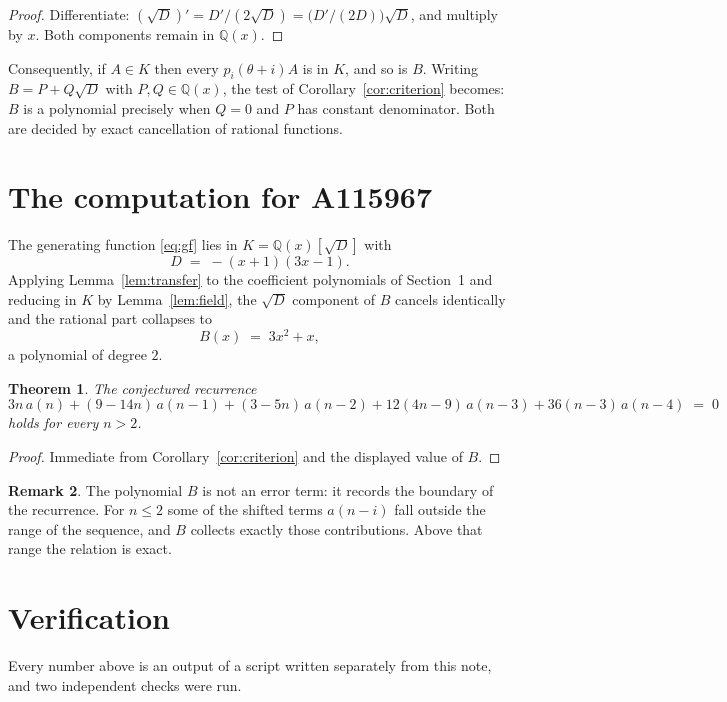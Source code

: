 \documentclass[11pt,a4paper]{article}
\theoremstyle{plain}
\newtheorem{theorem}{Theorem}
\theoremstyle{definition}
\newtheorem{remark}[theorem]{Remark}
\begin{document}
\begin{proof}
Differentiate: $(\sqrt{D})'=D'/(2\sqrt{D})=\bigl(D'/(2D)\bigr)\sqrt{D}$, and multiply by
$x$. Both components remain in $\mathbb{Q}(x)$.
\end{proof}

Consequently, if $A\in K$ then every $p_{i}(\theta+i)A$ is in $K$, and so is $B$. Writing
$B=P+Q\sqrt{D}$ with $P,Q\in\mathbb{Q}(x)$, the test of Corollary~\ref{cor:criterion}
becomes: $B$ is a polynomial precisely when $Q=0$ and $P$ has constant denominator. Both
are decided by exact cancellation of rational functions.

\section{The computation for A115967}

The generating function \eqref{eq:gf} lies in $K=\mathbb{Q}(x)[\sqrt{D}]$ with
\[
D \;=\; - \left(x + 1\right) \left(3 x - 1\right) .
\]
Applying Lemma~\ref{lem:transfer} to the coefficient polynomials of Section~1 and reducing
in $K$ by Lemma~\ref{lem:field}, the $\sqrt{D}$ component of $B$ cancels identically and
the rational part collapses to
\[
B(x)\;=\;3 x^{2} + x ,
\]
a polynomial of degree $2$.

\begin{theorem}
The conjectured recurrence
\[
3 n\,a(n) + (9 - 14 n)\,a(n-1) + (3 - 5 n)\,a(n-2) + 12 \left(4 n - 9\right)\,a(n-3) + 36 \left(n - 3\right)\,a(n-4) \;=\;0
\]
holds for every $n>2$.
\end{theorem}

\begin{proof}
Immediate from Corollary~\ref{cor:criterion} and the displayed value of $B$.
\end{proof}

\begin{remark}
The polynomial $B$ is not an error term: it records the boundary of the recurrence. For
$n\le2$ some of the shifted terms $a(n-i)$ fall outside the range of the sequence,
and $B$ collects exactly those contributions. Above that range the relation is exact.
\end{remark}

\section{Verification}

Every number above is an output of a script written separately from this note, and two
independent checks were run.
\end{document}
